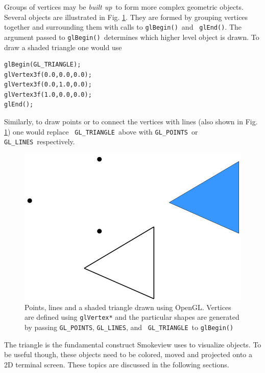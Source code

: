 \documentclass[11pt,twoside]{book}
\begin{document}
Groups of vertices may be {\em built up}\ to form more complex
geometric objects. Several objects are illustrated in Fig.
\ref{figshapes}.  They are formed by grouping vertices together
and surrounding them with calls to {\tt glBegin()}\ and {\tt
glEnd()}. The argument passed to {\tt glBegin()}\ determines which
higher level object is drawn. To draw a shaded triangle one would
use
\begin{lstlisting}
glBegin(GL_TRIANGLE);
glVertex3f(0.0,0.0,0.0);
glVertex3f(0.0,1.0,0.0);
glVertex3f(1.0,0.0,0.0);
glEnd();
\end{lstlisting}
Similarly, to draw points or to connect the vertices with lines
(also shown in Fig. \ref{figshapes}) one would replace {\tt
GL\_TRIANGLE}\ above with {\tt GL\_POINTS}\ or {\tt GL\_LINES}\
respectively.
\begin{figure}[\figoptions]
\begin{center}
\includegraphics[width=6.0in]{FIGURES/shapes}
\end{center}
\caption[Points, lines and a shaded triangle drawn using OpenGL.]
{Points, lines and a shaded triangle drawn using OpenGL. Vertices
are defined using {\tt glVertex*} and the particular shapes are
generated by passing {\tt GL\_POINTS}, {\tt GL\_LINES}, and {\tt
GL\_TRIANGLE}\ to {\tt glBegin()} } \label{figshapes}
\end{figure}

The triangle is the fundamental construct Smokeview uses to
visualize objects.  To be useful though, these objects need to be
colored, moved and projected onto a 2D terminal screen. These
topics are discussed in the following sections.

%
%
\end{document}
